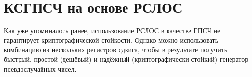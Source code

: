 







\section{КСГПСЧ на основе РСЛОС}

Как уже упоминалось ранее, использование РСЛОС в качестве ГПСЧ не гарантирует криптографической стойкости. Однако можно использовать комбинацию из нескольких регистров сдвига, чтобы в результате получить быстрый, простой (дешёвый) и надёжный (криптографически стойкий) генератор псевдослучайных чисел.






